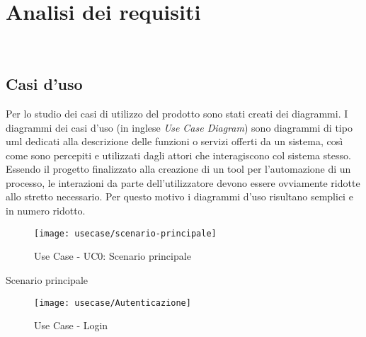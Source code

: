 
\chapter{Analisi dei requisiti}
\label{cap:analisi-requisiti}

\\

\section{Casi d'uso}

Per lo studio dei casi di utilizzo del prodotto sono stati creati dei diagrammi.
I diagrammi dei casi d'uso (in inglese \emph{Use Case Diagram}) sono diagrammi di tipo \gls{uml} dedicati alla descrizione delle funzioni o servizi offerti da un sistema, così come sono percepiti e utilizzati dagli attori che interagiscono col sistema stesso.\\
Essendo il progetto finalizzato alla creazione di un tool per l'automazione di un processo, le interazioni da parte dell'utilizzatore devono essere ovviamente ridotte allo stretto necessario. Per questo motivo i diagrammi d'uso risultano semplici e in numero ridotto.

\begin{figure}[!h] 
    \centering 
    \texttt{[image: usecase/scenario-principale]} 
    \caption{Use Case - UC0: Scenario principale}
\end{figure}

\begin{usecase}{0}{Scenario principale}
\label{uc:scenario-principale}
\end{usecase}

\begin{figure}[!h] 
    \centering 
    \texttt{[image: usecase/Autenticazione]} 
    \caption{Use Case - Login}
\end{figure}

